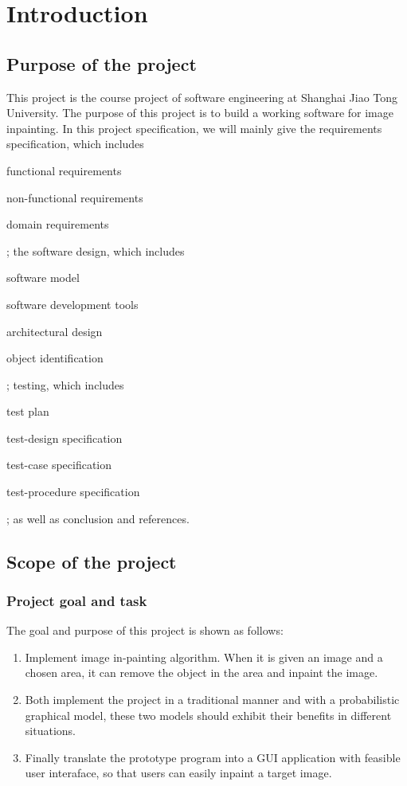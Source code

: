 \section{Introduction}

\subsection{Purpose of the project}
This project is the course project of software engineering at Shanghai
Jiao Tong University. The purpose of this project is to build a working
software for image inpainting. In this project specification, we will mainly
give the requirements specification, which includes 
\begin{enumerate*}
\item functional requirements
\item non-functional requirements
\item domain requirements
\end{enumerate*}; the software design, which includes 
\begin{enumerate*}
\item software model
\item software development tools
\item architectural design
\item object identification
\end{enumerate*}; testing, which includes
\begin{enumerate*}
\item test plan
\item test-design specification
\item test-case specification
\item test-procedure specification
\end{enumerate*}; as well as conclusion and references.


\subsection{Scope of the project}
\subsubsection{Project goal and task}
The goal and purpose of this project is shown as follows:
\begin{enumerate}
	\item Implement image in-painting algorithm. 
        When it is given an image and a chosen area, 
        it can remove the object in the area and inpaint the image.
    \item Both implement the project in a traditional manner and
        with a probabilistic graphical model, these two models should
        exhibit their benefits in different situations.
    \item Finally translate the prototype program into a GUI application
        with feasible user interaface, so that users can easily inpaint
        a target image.
\end{enumerate}
